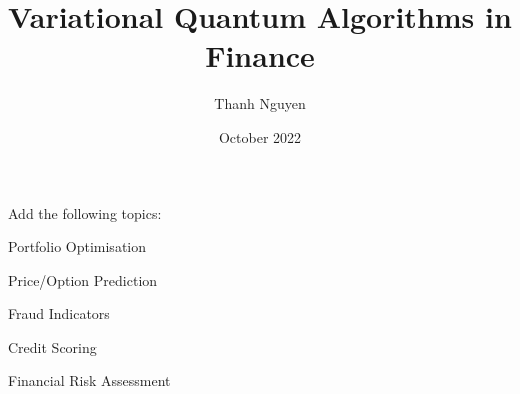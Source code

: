 \documentclass[oneside,notitlepage,12pt]{article}
\title{Variational Quantum Algorithms in Finance}
\author{Thanh Nguyen}
\date{October 2022}
\theoremstyle{definition}
\theoremstyle{remark}
\newcommand{\cmark}{\ding{51}}%
\newcommand{\done}{\rlap{$\square$}{\raisebox{2pt}{\large\hspace{1pt}\cmark}}%
\hspace{-2.5pt}}
\begin{document}
% 

\maketitle


\tableofcontents
\pagebreak



\begin{framed}
	Add the following topics:
	\begin{todolist}
		\item[\done] Portfolio Optimisation
		\item[\done] Price/Option Prediction
		\item[\done] Fraud Indicators
		\item[\done] Credit Scoring
		\item Financial Risk Assessment
	\end{todolist}
\end{framed}






% 
% 


\end{document}
